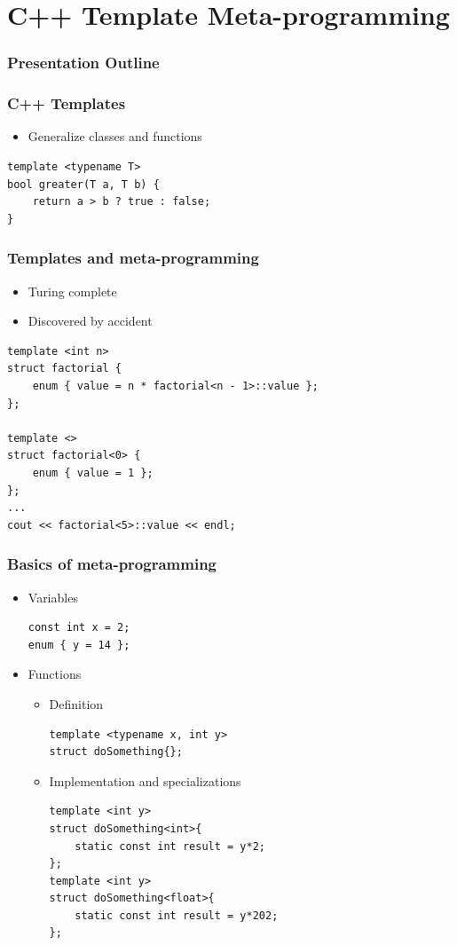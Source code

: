 \documentclass{beamer}
\begin{document}
\section{C++ Template Meta-programming}
\begin{frame}[fragile]
\frametitle{Presentation Outline}
\tableofcontents[currentsection]
\end{frame}

\begin{frame}[fragile]
\frametitle{C++ Templates}
\begin{itemize}
\item Generalize classes and functions
\end{itemize}

\begin{lstlisting}
template <typename T>
bool greater(T a, T b) {
    return a > b ? true : false;
}
\end{lstlisting}

\end{frame}

\begin{frame}[fragile]
\frametitle{Templates and meta-programming}
\begin{itemize}
\item Turing complete
\item Discovered by accident
\end{itemize}

\begin{lstlisting}
template <int n>
struct factorial {
	enum { value = n * factorial<n - 1>::value };
};
 
template <>
struct factorial<0> {
	enum { value = 1 };
};
...
cout << factorial<5>::value << endl;
\end{lstlisting}
\end{frame}


\begin{frame}[fragile]
\frametitle{Basics of meta-programming}
\begin{itemize}
\vspace*{-0.4cm}
\item Variables
\begin{lstlisting}
const int x = 2;
enum { y = 14 };
\end{lstlisting}
\item Functions
\begin{itemize}
\item Definition
\begin{lstlisting}
template <typename x, int y>
struct doSomething{};
\end{lstlisting}
\item Implementation and specializations
\begin{lstlisting}
template <int y>
struct doSomething<int>{
    static const int result = y*2;
};
template <int y>
struct doSomething<float>{
    static const int result = y*202;
};
\end{lstlisting}
\end{itemize}
\end{itemize}


\end{frame}
\end{document}
